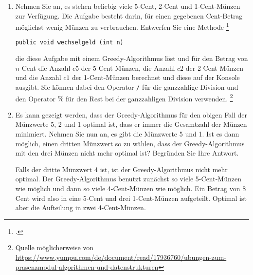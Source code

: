 \documentclass{bschlangaul-aufgabe}
\begin{document}

\begin{enumerate}


\item Nehmen Sie an, es stehen beliebig viele 5-Cent, 2-Cent und
1-Cent-Münzen zur Verfügung. Die Aufgabe besteht darin, für einen
gegebenen Cent-Betrag möglichst wenig Münzen zu verbrauchen. Entwerfen
Sie eine Methode
\footcite[Seite 1, Greedy-Münzwechsler, Aufgabe 1]{aud:ab:3}

\begin{verbatim}
public void wechselgeld (int n)
\end{verbatim}

die diese Aufgabe mit einem Greedy-Algorithmus löst und für den Betrag
von $n$ Cent die Anzahl $c5$ der 5-Cent-Münzen, die Anzahl $c2$ der
2-Cent-Münzen und die Anzahl $c1$ der 1-Cent-Münzen berechnet und diese
auf der Konsole ausgibt. Sie können dabei den Operator \texttt{/} für
die ganzzahlige Division und den Operator $\%$ für den Rest bei der
ganzzahligen Division verwenden.
\footnote{Quelle möglicherweise von \url{https://www.yumpu.com/de/document/read/17936760/ubungen-zum-prasenzmodul-algorithmen-und-datenstrukturen}}

\begin{bAntwort}
\end{bAntwort}


\item Es kann gezeigt werden, dass der Greedy-Algorithmus für den obigen
Fall der Münzwerte 5, 2 und 1 optimal ist, \dh dass er immer die
Gesamtzahl der Münzen minimiert. Nehmen Sie nun an, es gibt die
Münzwerte 5 und 1. Ist es dann möglich, einen dritten Münzwert so zu
wählen, dass der Greedy-Algorithmus mit den drei Münzen nicht mehr
optimal ist? Begründen Sie Ihre Antwort.

\begin{bAntwort}
Falls der dritte Münzwert 4 ist, ist der Greedy-Algorithmus nicht mehr
optimal. Der Greedy-Algorithmus benutzt zunächst so viele 5-Cent-Münzen
wie möglich und dann so viele 4-Cent-Münzen wie möglich. Ein Betrag von
8 Cent wird also in eine 5-Cent und drei 1-Cent-Münzen aufgeteilt.
Optimal ist aber die Aufteilung in zwei 4-Cent-Münzen.
\end{bAntwort}
\end{enumerate}

\begin{bAdditum}
\end{bAdditum}
\end{document}
